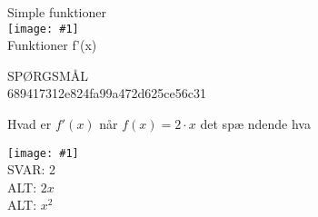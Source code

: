 \documentclass[]{article}
\newenvironment{question}[2]{SPØRGSMÅL\\}{\hspace{50px}}
\newcommand{\name}[1]{{\huge #1}\\}
\newcommand{\tag}[1]{#1}
\newcommand{\cover}[1]{\texttt{[image: \#1]}\\}
\newcommand{\image}[1]{\texttt{[image: \#1]}\\}
\newcommand{\answer}[1]{{\color{green} SVAR: #1}\\}
\newcommand{\alt}[1]{{\color{red} ALT: #1}\\}
\begin{document}
\name{Simple funktioner}
\cover{test.png}
\tag{Funktioner}
\tag{f'(x)}

\begin{question}{multi}\id{689417312e824fa99a472d625ce56c31}
    
Hvad er $f'(x)$ når $f(x)=2\cdot x$ det spæ ndende hva

\image{test.png}

\answer{2}
\alt{$2x$}
\alt{$x^2$}

\end{question}
\end{document}
